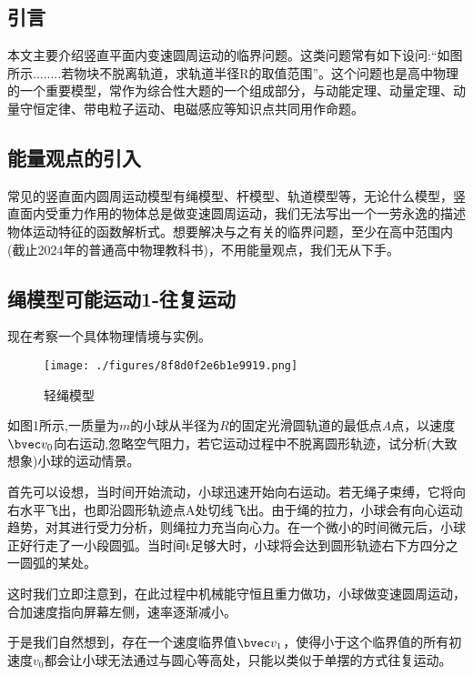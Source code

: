 

\begin{issues}
\issueTODO
\end{issues}

\subsection{引言}
本文主要介绍竖直平面内变速圆周运动的临界问题。这类问题常有如下设问:“如图所示........若物块不脱离轨道，求轨道半径R的取值范围”。这个问题也是高中物理的一个重要模型，常作为综合性大题的一个组成部分，与动能定理、动量定理、动量守恒定律、带电粒子运动、电磁感应等知识点共同用作命题。

\subsection{能量观点的引入}
常见的竖直面内圆周运动模型有绳模型、杆模型、轨道模型等，无论什么模型，竖直面内受重力作用的物体总是做变速圆周运动，我们无法写出一个一劳永逸的描述物体运动特征的函数解析式。想要解决与之有关的临界问题，至少在高中范围内(截止2024年的普通高中物理教科书)，不用能量观点，我们无从下手。

\subsection{绳模型可能运动1-往复运动}
现在考察一个具体物理情境与实例。
\begin{figure}[ht]
\centering
\texttt{[image: ./figures/8f8d0f2e6b1e9919.png]}
\caption{轻绳模型} \label{fig_CirVer_3}
\end{figure}
如图1所示,一质量为$m$的小球从半径为$R$的固定光滑圆轨道的最低点$A$点，以速度$\bvec v_0$向右运动,忽略空气阻力，若它运动过程中不脱离圆形轨迹，试分析(大致想象)小球的运动情景。

首先可以设想，当时间开始流动，小球迅速开始向右运动。若无绳子束缚，它将向右水平飞出，也即沿圆形轨迹点A处切线飞出。由于绳的拉力，小球会有向心运动趋势，对其进行受力分析，则绳拉力充当向心力。在一个微小的时间微元后，小球正好行走了一小段圆弧。当时间t足够大时，小球将会达到圆形轨迹右下方四分之一圆弧的某处。

这时我们立即注意到，在此过程中机械能守恒且重力做功，小球做变速圆周运动，合加速度指向屏幕左侧，速率逐渐减小。

于是我们自然想到，存在一个速度临界值$\bvec v_1$，使得小于这个临界值的所有初速度$v_0$都会让小球无法通过与圆心等高处，只能以类似于单摆的方式往复运动。

